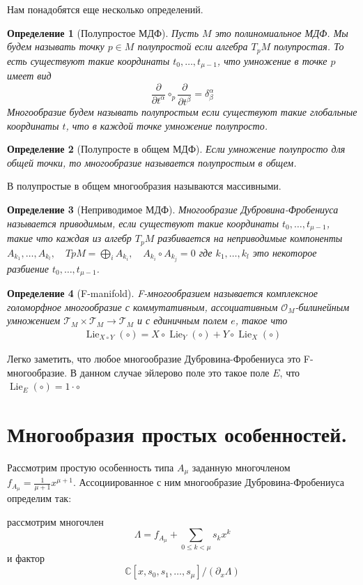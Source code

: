 \documentclass[a4paper, 10pt]{article}
\theoremstyle{plain}
\newtheorem{defin}{Определение}
\newcommand{\tang}[1][\hspace{0pt}]{\frac{\partial }{\partial #1}}
\begin{document}
Нам понадобятся еще несколько определений.
\begin{defin}[Полупростое МДФ]
    Пусть \(M\) это полиномиальное МДФ. Мы будем называть точку \(p \in M\) полупростой если алгебра \(T_pM\) полупростая. То есть существуют такие координаты \(t_0, \dots, t_{\mu-1}\), что умножение в точке \(p\) имеет вид \[\tang[t^\alpha]\circ_p\tang[t^\beta] = \delta^\alpha_\beta\]
    Многообразие будем называть полупростым если существуют такие глобальные координаты \(t\), что в каждой точке умножение полупросто.
\end{defin}
\begin{defin}[Полупросте в общем МДФ]
    Если умножение полупросто для общей точки, то многообразие называется полупростым в общем.
\end{defin}
В \cite{hertling1999multiplicationtangentbundle} полупростые в общем многообразия называются массивными.
\begin{defin}[Неприводимое МДФ]
    Многообразие Дубровина-Фробениуса называется приводимым, если существуют такие координаты \(t_0, \dots, t_{\mu-1}\), такие что каждая из алгебр \(T_pM\) разбивается на неприводимые компоненты \(A_{k_1}, \dots, A_{k_l},\quad TpM = \bigoplus_i A_{k_i}, \quad A_{k_i}\circ A_{k_j} = 0\) где \(k_1, \dots, k_l\) это некоторое разбиение \(t_0, \dots, t_{\mu-1}\).
\end{defin}
\begin{defin}[F-manifold]
    F-многообразием называется комплексное голоморфное многообразие с коммутативным, ассоциативным \(\mathcal{O}_M\)-билинейным умножением \(\mathcal{T}_M \times \mathcal{T}_M \to \mathcal{T}_M\) и с единичным полем \(e\), такое что 
    \begin{gather}\label{integr}
         \operatorname{Lie}_{X\circ Y}(\circ) = X\circ \operatorname{Lie}_Y(\circ) + Y\circ \operatorname{Lie}_X(\circ)
    \end{gather}
\end{defin}
Легко заметить, что любое многообразие Дубровина-Фробениуса это F-многообразие.
В данном случае эйлерово поле это такое поле \(E\), что \(\operatorname{Lie}_E(\circ) = 1 \cdot \circ\)
\section{Многообразия простых особенностей.}
Рассмотрим простую особенность типа \(A_{\mu}\) заданную многочленом \(f_{A_{\mu}} = \frac{1}{\mu+1}x^{\mu +1}\). Ассоциированное с ним многообразие Дубровина-Фробениуса определим так:\par 
рассмотрим многочлен \[\Lambda = f_{A_{\mu}} + \sum_{0 \leq k < \mu} s_k x^k\] и фактор \[\mathbb{C}[x, s_0, s_1, \dots, s_\mu]\Big/(\partial_x \Lambda)\]  
\end{document}
